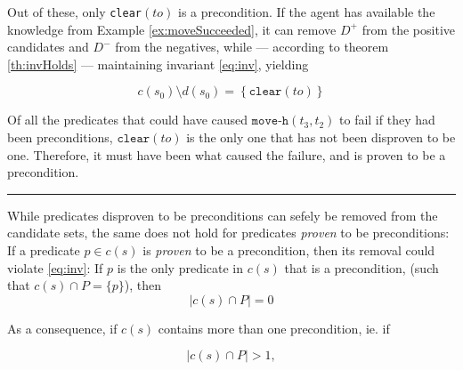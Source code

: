 \documentclass[../../Master.tex]{subfiles}
\begin{document}
\begin{example}
    Out of these, only \texttt{clear}$(to)$ is a precondition. If the agent has available the knowledge from Example \ref{ex:moveSucceeded}, it can remove $D^+$ from the positive candidates and $D^-$ from the negatives, while --- according to theorem \ref{th:invHolds} --- maintaining invariant \eqref{eq:inv}, yielding

    \begin{equation}
        c(s_0) \setminus d(s_0) = \left\{ \texttt{clear}(to) \right\}
    \end{equation}


    Of all the predicates that could have caused $\texttt{move-h}(t_3, t_2)$ to fail if they had been preconditions, $\texttt{clear}(to)$ is the only one that has not been disproven to be one. Therefore, it must have been what caused the failure, and is proven to be a precondition.

    \noindent\rule{\textwidth}{1pt}
\end{example}

While predicates disproven to be preconditions can sefely be removed from the candidate sets, the same does not hold for predicates \emph{proven} to be preconditions:
If a predicate $p \in c(s)$ is \textit{proven} to be a precondition, then its removal could violate \eqref{eq:inv}: If $p$ is the only predicate in $c(s)$ that is a precondition, (such that $c(s) \cap P = \{ p \}$), then
\begin{equation*}
    \left| c(s) \cap P \right| = 0
\end{equation*}

As a consequence, if $c(s)$ contains more than one precondition, ie. if

\begin{equation*}
    \left| c(s) \cap P \right| > 1,
\end{equation*}
\end{document}
